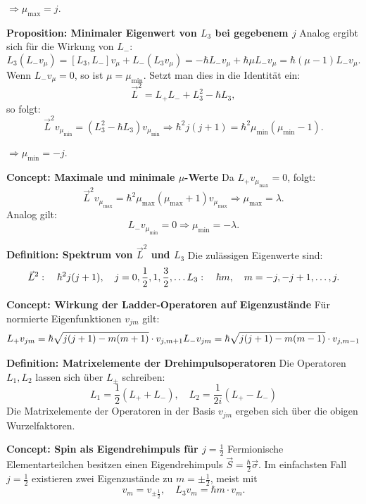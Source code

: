 \documentclass[10pt, letterpaper]{article}
\begin{document}
\(\Rightarrow \mu_{\max} = j\).



\textbf{Proposition: Minimaler Eigenwert von \(L_3\) bei gegebenem \(j\)}  
Analog ergibt sich für die Wirkung von \(L_-\):
$$
L_3 (L_- v_\mu) = [L_3, L_-] v_\mu + L_- (L_3 v_\mu)
= -\hbar L_- v_\mu + \hbar \mu L_- v_\mu = \hbar (\mu - 1) L_- v_\mu.
$$
Wenn \(L_- v_\mu = 0\), so ist \(\mu = \mu_{\min}\). Setzt man dies in die Identität ein:
$$
\vec{L}^2 = L_+ L_- + L_3^2 - \hbar L_3,
$$
so folgt:
$$
\vec{L}^2 v_{\mu_{\min}} = \left(L_3^2 - \hbar L_3\right) v_{\mu_{\min}}
\Rightarrow \hbar^2 j(j+1) = \hbar^2 \mu_{\min} (\mu_{\min} - 1).
$$

\(\Rightarrow \mu_{\min} = -j\).



\textbf{Concept: Maximale und minimale \(\mu\)-Werte}  
Da \(L_+ v_{\mu_{\text{max}}} = 0\), folgt:
$$
\vec{L}^2 v_{\mu_{\text{max}}} = \hbar^2 \mu_{\text{max}} (\mu_{\text{max}} + 1) v_{\mu_{\text{max}}}
\Rightarrow \mu_{\text{max}} = \lambda.
$$
Analog gilt:
$$
L_- v_{\mu_{\text{min}}} = 0 \Rightarrow \mu_{\text{min}} = -\lambda.
$$


\textbf{Definition: Spektrum von \(\vec{L}^2\) und \(L_3\)}  
Die zulässigen Eigenwerte sind:
$$
\vec{L}^2: \quad \hbar^2 j(j+1), \quad j = 0, \frac{1}{2}, 1, \frac{3}{2}, \dots \\
L_3: \quad \hbar m, \quad m = -j, -j+1, \dots, j.
$$


\textbf{Concept: Wirkung der Ladder-Operatoren auf Eigenzustände}  
Für normierte Eigenfunktionen \(v_{j m}\) gilt:
$$
L_+ v_{j m} = \hbar \sqrt{j(j+1) - m(m+1)} \cdot v_{j, m+1} \\
L_- v_{j m} = \hbar \sqrt{j(j+1) - m(m-1)} \cdot v_{j, m-1}
$$


\textbf{Definition: Matrixelemente der Drehimpulsoperatoren}  
Die Operatoren \(L_1, L_2\) lassen sich über \(L_\pm\) schreiben:
$$
L_1 = \frac{1}{2}(L_+ + L_-), \quad L_2 = \frac{1}{2i}(L_+ - L_-)
$$
Die Matrixelemente der Operatoren in der Basis \(v_{j m}\) ergeben sich über die obigen Wurzelfaktoren.


\textbf{Concept: Spin als Eigendrehimpuls für \(j = \frac{1}{2}\)}  
Fermionische Elementarteilchen besitzen einen Eigendrehimpuls \( \vec{S} = \frac{\hbar}{2} \vec{\sigma} \). Im einfachsten Fall \(j = \frac{1}{2}\) existieren zwei Eigenzustände zu \(m = \pm \frac{1}{2}\), meist mit
$$
v_{m} = v_{\pm \frac{1}{2}}, \quad L_3 v_m = \hbar m \cdot v_m.
$$
\end{document}
